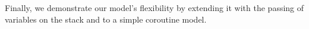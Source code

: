 \documentclass[acmtog,review,anonymous]{acmart}\settopmatter{printfolios=true,printccs=false,printacmref=false}
\begin{document}
Finally, we demonstrate our model's flexibility by extending it with the passing
of variables on the stack and to a simple coroutine model.



\end{document}
